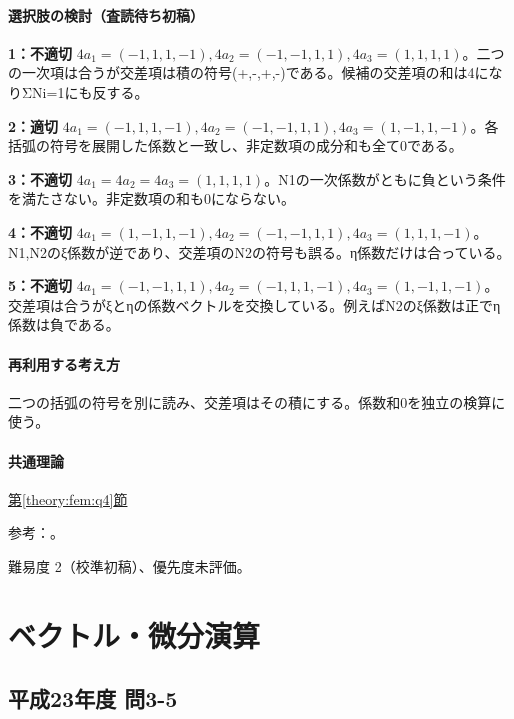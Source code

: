 \paragraph{選択肢の検討（査読待ち初稿）}\mbox{}\par

\noindent\textbf{1：不適切} \(4a_1=(-1,1,1,-1),4a_2=(-1,-1,1,1),4a_3=(1,1,1,1)\)。二つの一次項は合うが交差項は積の符号(+,-,+,-)である。候補の交差項の和は4になりΣNi=\allowbreak{}1にも反する。\par

\noindent\textbf{2：適切} \(4a_1=(-1,1,1,-1),4a_2=(-1,-1,1,1),4a_3=(1,-1,1,-1)\)。各括弧の符号を展開した係数と一致し、非定数項の成分和も全て0である。\par

\noindent\textbf{3：不適切} \(4a_1=4a_2=4a_3=(1,1,1,1)\)。N1の一次係数がともに負という条件を満たさない。非定数項の和も0にならない。\par

\noindent\textbf{4：不適切} \(4a_1=(1,-1,1,-1),4a_2=(-1,-1,1,1),4a_3=(1,1,1,-1)\)。N1,N2のξ係数が逆であり、交差項のN2の符号も誤る。η係数だけは合っている。\par

\noindent\textbf{5：不適切} \(4a_1=(-1,-1,1,1),4a_2=(-1,1,1,-1),4a_3=(1,-1,1,-1)\)。交差項は合うがξとηの係数ベクトルを交換している。例えばN2のξ係数は正でη係数は負である。\par

\paragraph{再利用する考え方} 二つの括弧の符号を別に読み、交差項はその積にする。係数和0を独立の検算に使う。

\paragraph{共通理論} \hyperref[theory:fem:q4]{第\ref*{theory:fem:q4}節}

\par 参考：\cite{mit_roy_fea1999}。

\par 難易度 2（校準初稿）、優先度未評価。

\section{ベクトル・微分演算}

\subsection{平成23年度 問3-5}
\label{q:h23-reg-basic-3-5}

